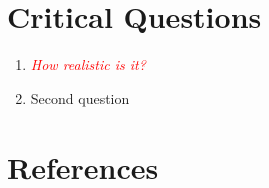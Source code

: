 \documentclass[oneside, notitlepage, twocolumn]{scrartcl}
\newcommand{\draft}[1]{\textcolor{red}{\textit{#1}}}
\begin{document}
\section{Critical Questions}
\begin{enumerate}
    \item \draft{How realistic is it?}
    \item Second question
\end{enumerate}

\section{References}
\begingroup
\renewcommand{\section}[2]{}%
\nocite{*}
\printbibliography%
\endgroup
\end{document}
